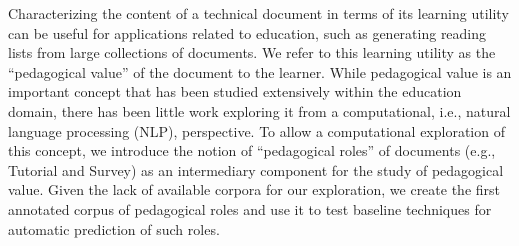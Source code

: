 Characterizing the content of a technical document in terms of its learning utility can be useful for applications related to education, such as generating reading lists from large collections of documents. We refer to this learning utility as the ``pedagogical value'' of the document to the learner. While pedagogical value is an important concept that has been studied extensively within the education domain, there has been little work exploring it from a computational, i.e., natural language processing (NLP), perspective. To allow a computational exploration of this concept, we introduce the notion of ``pedagogical roles'' of documents (e.g., Tutorial and Survey) as an intermediary component for the study of pedagogical value. Given the lack of available corpora for our exploration, we create the first annotated corpus of pedagogical roles and use it to test baseline techniques for automatic prediction of such roles.
